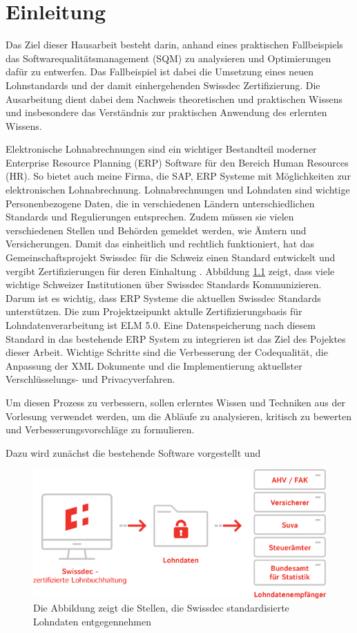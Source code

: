 \chapter{Einleitung}



Das Ziel dieser Hausarbeit besteht darin, anhand eines praktischen Fallbeispiels das Softwarequalitätsmanagement (SQM) zu analysieren und Optimierungen dafür zu entwerfen.
Das Fallbeispiel ist dabei die Umsetzung eines neuen Lohnstandards und der damit einhergehenden Swissdec Zertifizierung.
Die Ausarbeitung dient dabei dem Nachweis theoretischen und praktischen Wissens und insbesondere das Verständnis zur praktischen Anwendung des erlernten Wissens. 

Elektronische Lohnabrechnungen sind ein wichtiger Bestandteil moderner Enterprise Resource Planning (ERP) Software für den Bereich Human Resources (HR). So bietet auch meine Firma, die SAP, ERP Systeme mit Möglichkeiten zur elektronischen Lohnabrechnung.
Lohnabrechnungen und Lohndaten sind wichtige Personenbezogene Daten, die in verschiedenen Ländern unterschiedlichen Standards und Regulierungen entsprechen. Zudem müssen sie vielen verschiedenen Stellen und Behörden gemeldet werden, wie Ämtern und Versicherungen. 
Damit das einheitlich und rechtlich funktioniert, hat das Gemeinschaftsprojekt Swissdec für die Schweiz einen Standard entwickelt und vergibt Zertifizierungen für deren Einhaltung \cite{Swissdec.06.05.2023}. 
Abbildung \ref{fig:dh-website} zeigt, dass viele wichtige Schweizer Institutionen über Swissdec Standards Kommunizieren. Darum ist es wichtig, dass ERP Systeme die aktuellen Swissdec Standards unterstützen.
Die zum Projektzeipunkt aktulle Zertifizierungsbasis für Lohndatenverarbeitung ist ELM 5.0. Eine Datenspeicherung nach diesem Standard in das bestehende ERP System zu integrieren ist das Ziel des Pojektes dieser Arbeit. 
Wichtige Schritte sind die Verbesserung der Codequalität, die Anpassung der XML Dokumente und die Implementierung aktuellster Verschlüsselungs- und Privacyverfahren.
 
Um diesen Prozess zu verbessern, sollen erlerntes Wissen und Techniken aus der Vorlesung verwendet werden, um die Abläufe zu analysieren, kritisch zu bewerten und Verbesserungsvorschläge zu formulieren.
 
 Dazu wird zunächst die bestehende Software vorgestellt und %

\begin{figure}
	\centering
	\includegraphics[width=1.\textwidth]{Bilder/grafik_lohndaten_de.png} 
	\caption{Die Abbildung zeigt die Stellen, die Swissdec standardisierte Lohndaten entgegennehmen \cite{Swissdec.06.05.2023}}
	\label{fig:dh-website}
\end{figure} 







